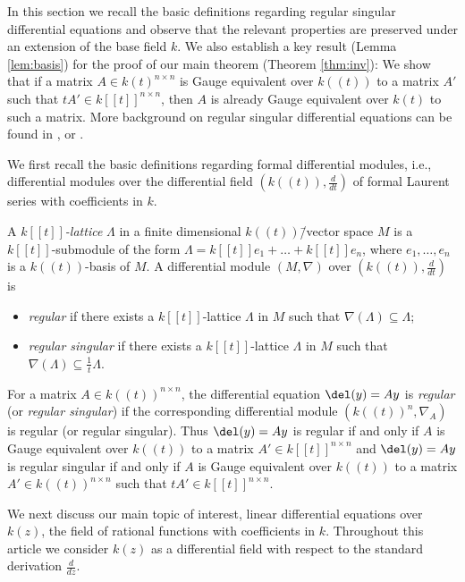 \documentclass[a4paper, 11pt]{article}
\begin{document}
	
	In this section we recall the basic definitions regarding regular singular differential equations and observe that the relevant properties are preserved under an extension of the base field $k$. We also establish a key result (Lemma \ref{lem:basis}) for the proof of our main theorem (Theorem \ref{thm:inv}): We show that if a matrix $A\in k(t)^{n\times n}$ is Gauge equivalent over $k((t))$ to a matrix $A'$ such that $tA'\in k[[t]]^{n\times n}$, then $A$ is already Gauge equivalent over $k(t)$ to such a matrix. More background on regular singular differential equations can be found in \cite[Sections 5 and 6]{SVDP}, \cite{Saul} or \cite[Part~I]{MitschiSauzin}.
	
\medskip	
	
	We first recall the basic definitions regarding formal differential modules, i.e., differential modules over the differential field $(k((t)),\frac{d}{dt})$ of formal Laurent series with coefficients in $k$.
	
	
	
	
	 A \emph{$k[[t]]$-lattice} $\Lambda$ in a finite dimensional $k((t))$\=/vector space $M$ is a $k[[t]]$-submodule of the form $\Lambda=k[[t]]e_1+\ldots+k[[t]]e_n$, where $e_1,\ldots,e_n$ is a $k((t))$-basis of $M$.  
	A differential module $(M,\nabla)$ over $(k((t)),\frac{d}{dt})$ is 	
	\begin{itemize}
		 \item \emph{regular} if there exists a $k[[t]]$-lattice $\Lambda$ in $M$ such that $\nabla(\Lambda)\subseteq \Lambda$;
		 \item \emph{regular singular} if there exists a $k[[t]]$-lattice $\Lambda$ in $M$ such that $\nabla(\Lambda)\subseteq \frac{1}{t}\Lambda$.
	\end{itemize}
	
For a matrix $A\in k((t))^{n\times n}$, the differential equation $\del(y)=Ay$ is \emph{regular} (or \emph{regular singular}) if the corresponding differential module $(k((t))^n,\nabla_A)$ is regular (or regular singular). Thus $\del(y)=Ay$ is regular if and only if $A$ is Gauge equivalent over $k((t))$ to a matrix $A'\in k[[t]]^{n\times n}$ and $\del(y)=Ay$ is regular singular if and only if $A$ is Gauge equivalent over $k((t))$ to a matrix $A'\in k((t))^{n\times n}$ such that $tA'\in k[[t]]^{n\times n}$. 


\medskip

We next discuss our main topic of interest, linear differential equations over $k(z)$, the field of rational functions with coefficients in $k$. Throughout this article we consider $k(z)$ as a differential field with respect to the standard derivation $\frac{d}{dz}$. 
\end{document}
